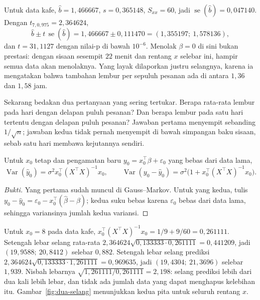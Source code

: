 Untuk data kafe, $\hat b=1{,}466667$, $s=0{,}365148$, $S_{xx}=60$, jadi
$\operatorname{se}(\hat b)=0{,}047140$. Dengan $t_{7,0{,}975}=2{,}364624$,
\[
\hat b\pm t\,\operatorname{se}(\hat b)=1{,}466667\pm0{,}111470
=(1{,}355197;\ 1{,}578136),
\]
dan $t=31{,}1127$ dengan nilai-p di bawah $10^{-6}$. Menolak $\beta=0$ di sini bukan
prestasi: dengan sisaan sesempit $22$ menit dan rentang $x$ selebar ini, hampir semua
data akan menolaknya. Yang layak dilaporkan justru selangnya, karena ia mengatakan
bahwa tambahan lembur per sepuluh pesanan ada di antara $1{,}36$ dan $1{,}58$ jam.

Sekarang bedakan dua pertanyaan yang sering tertukar. Berapa rata-rata lembur pada hari
dengan delapan puluh pesanan? Dan berapa lembur pada satu hari tertentu dengan delapan
puluh pesanan? Jawaban pertama menyempit sebanding $1/\sqrt n$; jawaban kedua tidak
pernah menyempit di bawah simpangan baku sisaan, sebab satu hari membawa kejutannya
sendiri.

\begin{proposisi}
Untuk $x_0$ tetap dan pengamatan baru $y_0=x_0^{\top}\beta+\varepsilon_0$ yang bebas
dari data lama,
\[
\operatorname{Var}(\hat y_0)=\sigma^2x_0^{\top}(X^{\top}X)^{-1}x_0,
\qquad
\operatorname{Var}(y_0-\hat y_0)=\sigma^2\bigl(1+x_0^{\top}(X^{\top}X)^{-1}x_0\bigr).
\]
\end{proposisi}

\begin{proof}[Bukti]
Yang pertama sudah muncul di Gauss--Markov. Untuk yang kedua, tulis
$y_0-\hat y_0=\varepsilon_0-x_0^{\top}(\hat\beta-\beta)$; kedua suku bebas karena
$\varepsilon_0$ bebas dari data lama, sehingga variansinya jumlah kedua variansi.
\end{proof}

Untuk $x_0=8$ pada data kafe, $x_0^{\top}(X^{\top}X)^{-1}x_0=1/9+9/60=0{,}261111$.
Setengah lebar selang rata-rata $2{,}364624\sqrt{0{,}133333\cdot0{,}261111}=0{,}441209$,
jadi $(19{,}9588;\ 20{,}8412)$ selebar $0{,}882$. Setengah lebar selang prediksi
$2{,}364624\sqrt{0{,}133333\cdot1{,}261111}=0{,}969635$, jadi
$(19{,}4304;\ 21{,}3696)$ selebar $1{,}939$. Nisbah lebarnya
$\sqrt{1{,}261111/0{,}261111}=2{,}198$: selang prediksi lebih dari dua kali lebih lebar,
dan tidak ada jumlah data yang dapat menghapus kelebihan itu. Gambar~\ref{fig:dua-selang}
menunjukkan kedua pita untuk seluruh rentang $x$.

